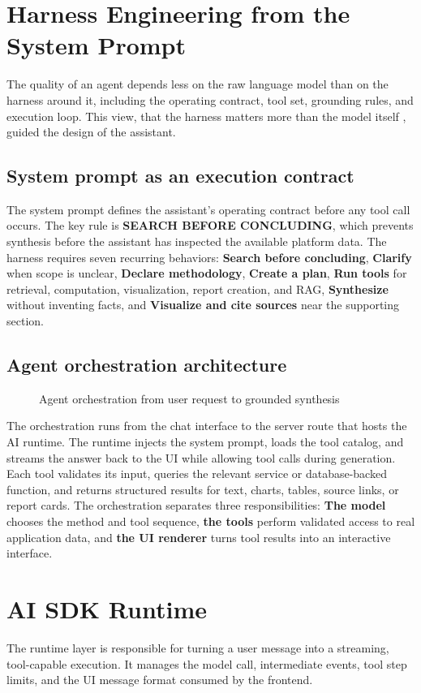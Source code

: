 \section{Harness Engineering from the System Prompt}
The quality of an agent depends less on the raw language model than on the harness around it, including the operating contract, tool set, grounding rules, and execution loop. This view, that the harness matters more than the model itself , guided the design of the \projectname{} assistant.
\subsection{System prompt as an execution contract}
The system prompt defines the assistant's operating contract before any tool call occurs. The key rule is \textbf{SEARCH BEFORE CONCLUDING}, which prevents synthesis before the assistant has inspected the available platform data. The harness requires seven recurring behaviors: \textbf{Search before concluding}, \textbf{Clarify} when scope is unclear, \textbf{Declare methodology}, \textbf{Create a plan}, \textbf{Run tools} for retrieval, computation, visualization, report creation, and RAG, \textbf{Synthesize} without inventing facts, and \textbf{Visualize and cite sources} near the supporting section.
\subsection{Agent orchestration architecture}
\begin{figure}[htbp]
  \centering
  \caption{Agent orchestration from user request to grounded synthesis}
\end{figure}
The orchestration runs from the chat interface to the server route that hosts the AI runtime. The runtime injects the system prompt, loads the tool catalog, and streams the answer back to the UI while allowing tool calls during generation. Each tool validates its input, queries the relevant service or database-backed function, and returns structured results for text, charts, tables, source links, or report cards. The orchestration separates three responsibilities: \textbf{The model} chooses the method and tool sequence, \textbf{the tools} perform validated access to real application data, and \textbf{the UI renderer} turns tool results into an interactive interface.
\section{AI SDK Runtime}
The runtime layer is responsible for turning a user message into a streaming, tool-capable execution. It manages the model call, intermediate events, tool step limits, and the UI message format consumed by the frontend.
